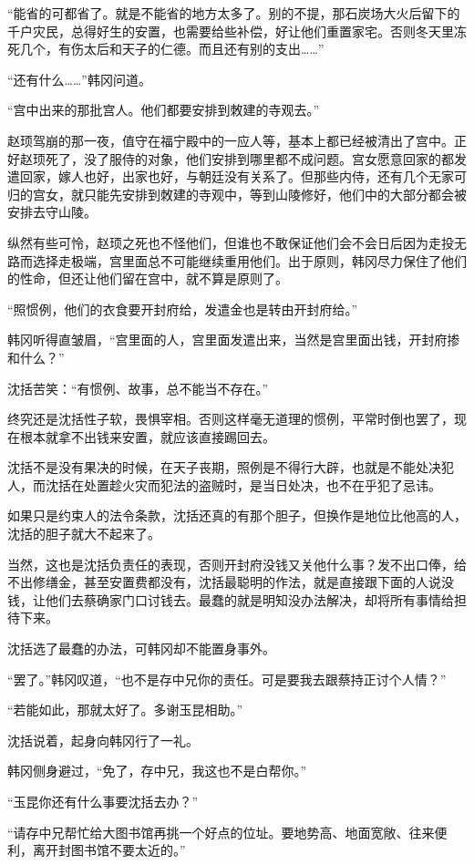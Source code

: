 “能省的可都省了。就是不能省的地方太多了。别的不提，那石炭场大火后留下的千户灾民，总得好生的安置，也需要给些补偿，好让他们重置家宅。否则冬天里冻死几个，有伤太后和天子的仁德。而且还有别的支出……”

“还有什么……”韩冈问道。

“宫中出来的那批宫人。他们都要安排到敇建的寺观去。”

赵顼驾崩的那一夜，值守在福宁殿中的一应人等，基本上都已经被清出了宫中。正好赵顼死了，没了服侍的对象，他们安排到哪里都不成问题。宫女愿意回家的都发遣回家，嫁人也好，出家也好，与朝廷没有关系了。但那些内侍，还有几个无家可归的宫女，就只能先安排到敇建的寺观中，等到山陵修好，他们中的大部分都会被安排去守山陵。

纵然有些可怜，赵顼之死也不怪他们，但谁也不敢保证他们会不会日后因为走投无路而选择走极端，宫里面总不可能继续重用他们。出于原则，韩冈尽力保住了他们的性命，但还让他们留在宫中，就不算是原则了。

“照惯例，他们的衣食要开封府给，发遣金也是转由开封府给。”

韩冈听得直皱眉，“宫里面的人，宫里面发遣出来，当然是宫里面出钱，开封府掺和什么？”

沈括苦笑：“有惯例、故事，总不能当不存在。”

终究还是沈括性子软，畏惧宰相。否则这样毫无道理的惯例，平常时倒也罢了，现在根本就拿不出钱来安置，就应该直接踢回去。

沈括不是没有果决的时候，在天子丧期，照例是不得行大辟，也就是不能处决犯人，而沈括在处置趁火灾而犯法的盗贼时，是当日处决，也不在乎犯了忌讳。

如果只是约束人的法令条款，沈括还真的有那个胆子，但换作是地位比他高的人，沈括的胆子就大不起来了。

当然，这也是沈括负责任的表现，否则开封府没钱又关他什么事？发不出口俸，给不出修缮金，甚至安置费都没有，沈括最聪明的作法，就是直接跟下面的人说没钱，让他们去蔡确家门口讨钱去。最蠢的就是明知没办法解决，却将所有事情给担待下来。

沈括选了最蠢的办法，可韩冈却不能置身事外。

“罢了。”韩冈叹道，“也不是存中兄你的责任。可是要我去跟蔡持正讨个人情？”

“若能如此，那就太好了。多谢玉昆相助。”

沈括说着，起身向韩冈行了一礼。

韩冈侧身避过，“免了，存中兄，我这也不是白帮你。”

“玉昆你还有什么事要沈括去办？”

“请存中兄帮忙给大图书馆再挑一个好点的位址。要地势高、地面宽敞、往来便利，离开封图书馆不要太近的。”

